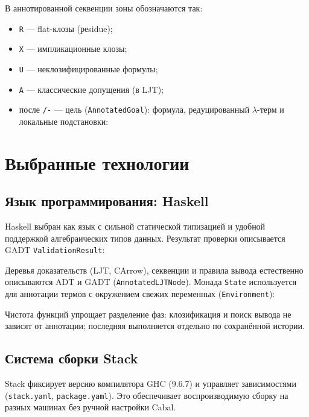 \documentclass[a4paper,12pt]{article}
\newenvironment{listingcenter}{%
  \begin{center}\begin{minipage}{\linewidth}%
}{%
  \end{minipage}\end{center}%
}
\newcommand{\hssnippet}[2]{%
  \begin{listingcenter}%
  \end{listingcenter}}
\begin{document}
В аннотированной секвенции зоны обозначаются так:
\begin{itemize}
  \item \texttt{R} --- flat-клозы (реsidue);
  \item \texttt{X} --- импликационные клозы;
  \item \texttt{U} --- неклозифицированные формулы;
  \item \texttt{A} --- классические допущения (в LJT);
  \item после \verb|/-| --- цель (\texttt{AnnotatedGoal}): формула,
        редуцированный $\lambda$-терм и локальные подстановки:
\hssnippet{annotated-goal.hs}{Тип \texttt{AnnotatedGoal} и форматирование цели}
\end{itemize}

\section{Выбранные технологии}

\subsection{Язык программирования: Haskell}

Haskell выбран как язык с сильной статической типизацией и удобной поддержкой
алгебраических типов данных. Результат проверки описывается GADT
\texttt{ValidationResult}:
\hssnippet{validation-result.hs}{GADT \texttt{ValidationResult} (\texttt{ProverR.hs})}

Деревья доказательств (LJT, CArrow), секвенции и правила вывода естественно
описываются ADT и GADT (\texttt{AnnotatedLJTNode}).
Монада \texttt{State} используется для аннотации термов с окружением свежих
переменных (\texttt{Environment}):
\hssnippet{environment.hs}{Окружение \texttt{Environment} для аннотации термов}

Чистота функций упрощает разделение фаз: клозификация и поиск вывода не
зависят от аннотации; последняя выполняется отдельно по сохранённой истории.

\subsection{Система сборки Stack}

Stack фиксирует версию компилятора GHC (9.6.7) и управляет зависимостями
(\texttt{stack.yaml}, \texttt{package.yaml}). Это обеспечивает воспроизводимую
сборку на разных машинах без ручной настройки Cabal.
\end{document}

